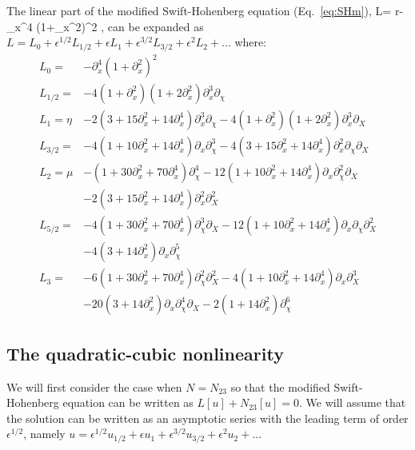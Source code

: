\documentclass[../main/WavelengthCompetition.tex]{subfiles}
\begin{document}
The linear part of the modified Swift-Hohenberg equation (Eq.~\ref{eq:SHm}), 
\beqn
L= r-\partial_{x}^4 \left(1+\partial_{x}^2\right)^2 ,
\eeqn
can be expanded as $L=L_0+\epsilon^{1/2} L_{1/2}+\epsilon L_1+\epsilon^{3/2} L_{3/2}+\epsilon^2 L_2+...$ where:
\begin{subequations}
\begin{align}
L_0 = &-\partial_x^4\left(1+\partial_x^2\right)^2  \\
L_{1/2} = & -4\left(1+\partial_x^2\right)  \left(1+2 \partial_x^2\right)\partial_x^3\partial_{\chi} \\
L_1 = \eta&- 2 \left(3+15 \partial_x^2+14 \partial_x^4\right) \partial_x^3\partial_{\chi} -4\left(1+\partial_x^2\right)  \left(1+2 \partial_x^2\right)\partial_x^3\partial_{X}\\  
L_{3/2} = &-4   \left(1+10 \partial_x^2+ 14 \partial_x^4\right)\partial_x \partial_{\chi}^3 - 4 \left(3+15 \partial_x^2+14 \partial_x^4\right) \partial_x^2\partial_{\chi}\partial_{X} \\
L_2 = \mu&-\left(1+30 \partial_x^2 +70\partial_x^4\right)\partial_{\chi}^4 - 12\left(1+10 \partial_x^2+ 14 \partial_x^4\right)\partial_x \partial_{\chi}^2\partial_{X} \nonumber\\   &- 2 \left(3+15 \partial_x^2+14 \partial_x^4\right) \partial_x^2\partial_{X}^2 \\
L_{5/2} = &-4\left(1+30 \partial_x^2 +70\partial_x^4\right)\partial_{\chi}^3\partial_{X} - 12\left(1+10 \partial_x^2+ 14 \partial_x^4\right)\partial_x \partial_{\chi}\partial_{X}^2\nonumber \\   & -4 \left(3+14 \partial_x^2\right) \partial_x\partial_{\chi}^5  \\
L_{3} = &-6\left(1+30 \partial_x^2 +70\partial_x^4\right)\partial_{\chi}^2\partial_{X}^2 - 4\left(1+10 \partial_x^2+ 14 \partial_x^4\right)\partial_x\partial_{X}^3\nonumber \\  &-20 \left(3+14 \partial_x^2\right) \partial_x\partial_{\chi}^4\partial_{X} -2 \left(1+14 \partial_x^2\right) \partial_{\chi}^6
\end{align}
\end{subequations}

\subsection{The quadratic-cubic nonlinearity}
We will first consider the case when $N=N_{23}$ so that the modified Swift-Hohenberg equation can be written as $L[u]+N_{23}[u]=0$.  We will assume that the solution can be written as an asymptotic series with the leading term of order $\epsilon^{1/2}$, namely $u=\epsilon^{1/2} u_{1/2} +\epsilon u_1 + \epsilon^{3/2} u_{3/2} +\epsilon^2 u_2+...$   
\end{document}
